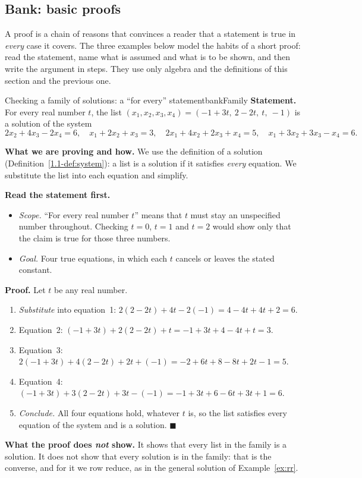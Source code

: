 \documentclass[11pt]{article}
\begin{document}
\subsection*{Bank: basic proofs}

A proof is a chain of reasons that convinces a reader that a statement is true in \emph{every} case it covers. The three examples below model the habits of a short proof: read the statement, name what is assumed and what is to be shown, and then write the argument in steps. They use only algebra and the definitions of this section and the previous one.

\begin{exmp}{Checking a family of solutions: a ``for every'' statement}{bankFamily}
\textbf{Statement.} For every real number $t$, the list $(x_1,x_2,x_3,x_4)=(-1+3t,\ 2-2t,\ t,\ -1)$ is a solution of the system
\[
2x_2+4x_3-2x_4=6,\quad x_1+2x_2+x_3=3,\quad 2x_1+4x_2+2x_3+x_4=5,\quad x_1+3x_2+3x_3-x_4=6.
\]

\textbf{What we are proving and how.} We use the definition of a solution (Definition~\ref{1.1-def:system}): a list is a solution if it satisfies \emph{every} equation. We substitute the list into each equation and simplify.

\textbf{Read the statement first.}
\begin{itemize}
  \item \emph{Scope.} ``For every real number $t$'' means that $t$ must stay an unspecified number throughout. Checking $t=0$, $t=1$ and $t=2$ would show only that the claim is true for those three numbers.
  \item \emph{Goal.} Four true equations, in which each $t$ cancels or leaves the stated constant.
\end{itemize}

\textbf{Proof.} Let $t$ be any real number.
\begin{enumerate}[itemsep=2pt]
  \item \emph{Substitute} into equation~1: $2(2-2t)+4t-2(-1)=4-4t+4t+2=6$.
  \item Equation~2: $(-1+3t)+2(2-2t)+t=-1+3t+4-4t+t=3$.
  \item Equation~3: $2(-1+3t)+4(2-2t)+2t+(-1)=-2+6t+8-8t+2t-1=5$.
  \item Equation~4: $(-1+3t)+3(2-2t)+3t-(-1)=-1+3t+6-6t+3t+1=6$.
  \item \emph{Conclude.} All four equations hold, whatever $t$ is, so the list satisfies every equation of the system and is a solution. \qquad$\blacksquare$
\end{enumerate}
\textbf{What the proof does \emph{not} show.} It shows that every list in the family is a solution. It does not show that every solution is in the family: that is the converse, and for it we row reduce, as in the general solution of Example~\ref{ex:rr}.
\end{exmp}
\end{document}

